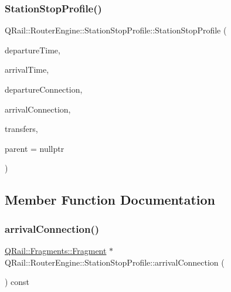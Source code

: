 \subsubsection{\texorpdfstring{StationStopProfile()}{StationStopProfile()}}
{\footnotesize\ttfamily Q\+Rail\+::\+Router\+Engine\+::\+Station\+Stop\+Profile\+::\+Station\+Stop\+Profile (\begin{DoxyParamCaption}\item[{const Q\+Date\+Time \&}]{departure\+Time,  }\item[{const Q\+Date\+Time \&}]{arrival\+Time,  }\item[{\mbox{\hyperlink{classQRail_1_1Fragments_1_1Fragment}{Q\+Rail\+::\+Fragments\+::\+Fragment}} $\ast$}]{departure\+Connection,  }\item[{\mbox{\hyperlink{classQRail_1_1Fragments_1_1Fragment}{Q\+Rail\+::\+Fragments\+::\+Fragment}} $\ast$}]{arrival\+Connection,  }\item[{const qint16}]{transfers,  }\item[{Q\+Object $\ast$}]{parent = {\ttfamily nullptr} }\end{DoxyParamCaption})\hspace{0.3cm}{\ttfamily [explicit]}}



\subsection{Member Function Documentation}
\mbox{\label{classQRail_1_1RouterEngine_1_1StationStopProfile_ae06073b8f69ae105c0219234ebba77b8}} 
\subsubsection{\texorpdfstring{arrivalConnection()}{arrivalConnection()}}
{\footnotesize\ttfamily \mbox{\hyperlink{classQRail_1_1Fragments_1_1Fragment}{Q\+Rail\+::\+Fragments\+::\+Fragment}} $\ast$ Q\+Rail\+::\+Router\+Engine\+::\+Station\+Stop\+Profile\+::arrival\+Connection (\begin{DoxyParamCaption}{ }\end{DoxyParamCaption}) const}

